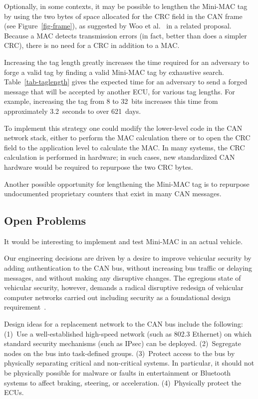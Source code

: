 Optionally, in some contexts, it may be 
possible to lengthen the Mini-MAC tag by 
using the two bytes of space allocated for the CRC field in the CAN frame (see Figure~\ref{fig-frame}),
as suggested by Woo et al.~\cite{Woo-14} in a related proposal.
Because a MAC detects transmission errors (in fact, better than does a simpler CRC), there is no need for
a CRC in addition to a MAC.  

Increasing the tag length greatly increases the time required for an adversary to forge a valid tag by
finding a valid Mini-MAC tag by exhaustive search.  
Table~\ref{tab-taglength} gives the expected time for an adversary to send a forged message 
that will be accepted by another ECU, for various tag lengths.  
For example, increasing the tag from 8 to 32~bits increases this time from
approximately 3.2~seconds to over 621~days.


To implement this strategy one could modify the lower-level code in the CAN network stack, 
either to perform the MAC calculation there 
or to open the CRC field to the application level to calculate the MAC. 
In many systems, the CRC calculation is performed in hardware;
in such cases, new standardized CAN hardware would be required to repurpose the two CRC bytes.

Another possible opportunity for lengthening the Mini-MAC tag is to repurpose undocumented
proprietary counters that exist in many CAN messages.

\subsection{Open Problems}
\label{open}

It would be interesting to implement and test Mini-MAC in an actual vehicle.

Our engineering decisions are driven by a desire to improve vehicular security by adding authentication
to the CAN bus, without increasing bus traffic or delaying messages, and without making any
disruptive changes.  The egregious state of vehicular security, however, demands a radical disruptive
redesign of vehicular computer networks carried out including security as a foundational design
requirement~\cite{Wolf2006}. 

Design ideas for a replacement network to the CAN bus include the following:  
(1)~Use a well-established high-speed network (such as 802.3 Ethernet) on which
standard security mechanisms (such as IPsec) can be deployed.
(2)~Segregate nodes on the bus into task-defined groups.
(3)~Protect access to the bus by physically separating critical and non-critical systems.
In particular, it should not be physically possible for malware or faults in entertainment or 
Bluetooth systems to affect braking, steering, or acceleration. 
(4)~Physically protect the ECUs. 

